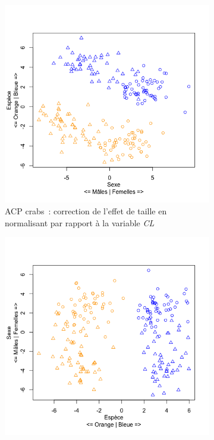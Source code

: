 \documentclass[a4paper,10pt]{report}
\begin{document}
\begin{figure}[H]
	\centering
	\captionsetup{justification=centering, margin=2cm}
	\begin{subfigure}[b]{0.5\linewidth}
		\centering
		\captionsetup{justification=centering, margin=1cm}
		\includegraphics[width=1\columnwidth]{img/2-3-2-biplot-acp-crabs-corrected-CL}
		\caption{\scriptsize ACP crabs~: correction de l'effet de taille en normalisant par rapport à la variable \textit{CL}}
		\label{fig:biplot_acp_crabs_corrected_CL}
	\end{subfigure}%
	\begin{subfigure}[b]{0.5\linewidth}
		\centering
		\captionsetup{justification=centering, margin=1cm}
		\includegraphics[width=1\columnwidth]{img/2-3-2-biplot-acp-crabs-corrected-CW}

\end{subfigure}
\end{figure}
\end{document}
